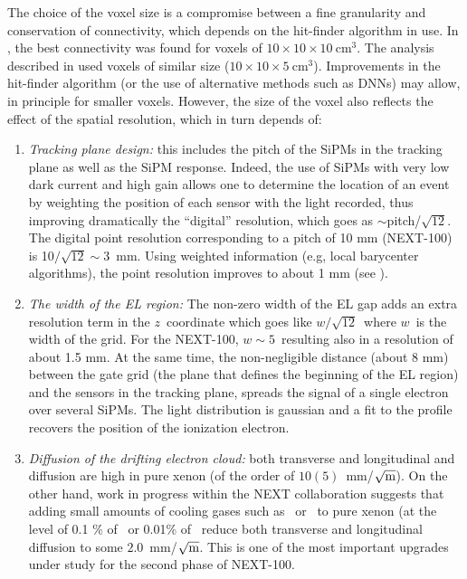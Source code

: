 \documentclass[a4paper,11pt]{article}
\begin{document}
The choice of the voxel size is a compromise between a fine granularity and conservation of connectivity, which depends on the hit-finder algorithm in use. In \cite{NEXT_topology},  the best connectivity  was  found for voxels of 
$10 \times 10 \times 10 \mathrm{~cm^3}$. The analysis described in \cite{Martin-Albo:2015rhw} used voxels
of similar size ($10 \times 10 \times 5 \mathrm{~cm^3}$).  Improvements in the hit-finder algorithm (or the use of alternative methods such as DNNs) may allow, in principle for smaller voxels. However, the size of the voxel also reflects the effect of the spatial resolution, which in turn depends of: 
\begin{enumerate}
\item {\em Tracking plane design:} this includes the pitch of the SiPMs in the tracking plane as well as the SiPM response. Indeed, the use of SiPMs with very low dark current and high gain allows one to determine the location of an event by weighting the position of each sensor with the light recorded, thus improving dramatically the ``digital'' resolution, which goes as $\sim$pitch/$\sqrt{12}$. The digital point resolution corresponding to a pitch of 10 mm (NEXT-100) is 10$/\sqrt{12} \sim 3$~mm. Using weighted information (e.g, local barycenter algorithms), the point resolution improves to about 1 mm (see \cite{Lorca:2014sra}). 
\item {\em The width of the EL region:}
The non-zero width of the EL gap adds an extra resolution term in the $z$~coordinate which goes like $w/\sqrt{12}$~where $w$~is the width of the grid. For the NEXT-100, $w\sim 5$~resulting also in a resolution of about 1.5 mm. At the same time, the non-negligible distance (about 8 mm) between the gate grid (the plane that defines the beginning of the EL region) and the sensors in the tracking plane, spreads the signal of a single electron over several SiPMs. The light distribution is gaussian and a fit to the profile recovers the position of the ionization electron.
\item {\em Diffusion of the drifting electron cloud:}  both transverse and  longitudinal and  diffusion are high in pure xenon (of the order of $10 (5) $~mm/$\sqrt{\rm{m}}$). On the other hand, work in progress within the NEXT collaboration\cite{Azevedo:2015eok} suggests that adding small amounts of cooling gases such as \CHF\ or \CFF\ to pure xenon (at the level of 0.1 \% of \CHF\ or 0.01\% of \CFF\ reduce both transverse and longitudinal diffusion to some $2.0$~mm/$\sqrt{\rm{m}}$. This is one of the most important upgrades under study for the second phase of NEXT-100. 
\end{enumerate}
\end{document}
